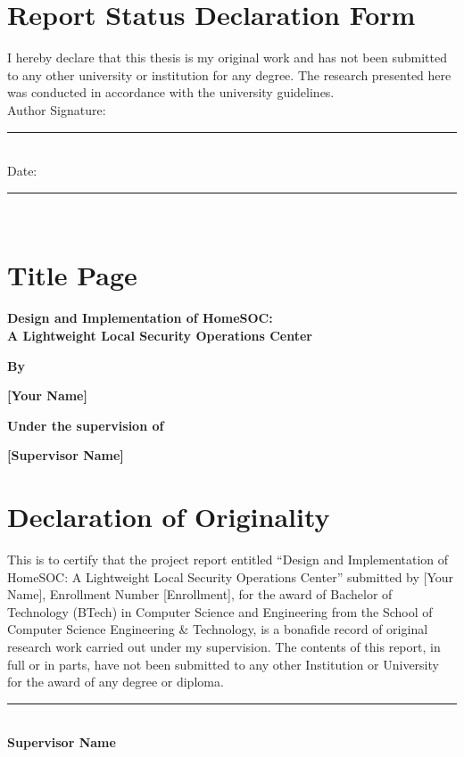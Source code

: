 \chapter*{Report Status Declaration Form}
\vspace{1cm}
I hereby declare that this thesis is my original work and has not been submitted to any other university or institution for any degree. The research presented here was conducted in accordance with the university guidelines.
\vspace{2cm}\\
\noindent
Author Signature: \rule{5cm}{1pt} \\
Date: \rule{3cm}{1pt} \\

\clearpage

\chapter*{Title Page}
\begin{center}
    \vspace*{2cm}
    {\fontsize{14pt}{16.8pt}\selectfont \textbf{Design and Implementation of HomeSOC:\\ A Lightweight Local Security Operations Center}\par}
    \vspace{2cm}
    {\fontsize{12pt}{14.4pt}\selectfont \textbf{By}\par}
    {\fontsize{12pt}{14.4pt}\selectfont \textbf{[Your Name]}\par}
    \vspace{2cm}
    {\fontsize{12pt}{14.4pt}\selectfont \textbf{Under the supervision of}\par}
    {\fontsize{12pt}{14.4pt}\selectfont \textbf{[Supervisor Name]}\par}
\end{center}

\clearpage

\chapter*{Declaration of Originality}
This is to certify that the project report entitled ``Design and Implementation of HomeSOC: A Lightweight Local Security Operations Center'' submitted by [Your Name], Enrollment Number [Enrollment], for the award of Bachelor of Technology (BTech) in Computer Science and Engineering from the School of Computer Science Engineering \& Technology, is a bonafide record of original research work carried out under my supervision. The contents of this report, in full or in parts, have not been submitted to any other Institution or University for the award of any degree or diploma.
\vspace{2cm}\\
\noindent
\rule{5cm}{1pt} \\
\textbf{Supervisor Name}\\

